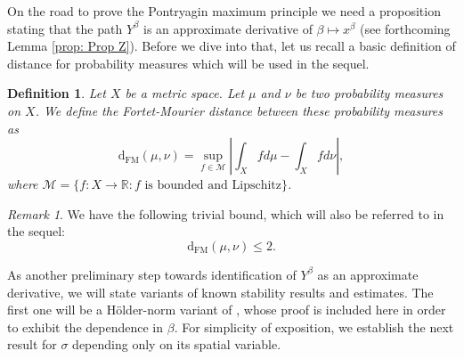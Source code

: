 \documentclass[12pt,reqno]{amsart}
\numberwithin{equation}{section}  %
\newcommand{\1}{{\bf 1}}
\newcommand{\2}{{\bf 2}}
\newcommand{\R}{\mathbb R}
\newtheorem{definition}[theorem]{Definition}
\theoremstyle{remark}
\newtheorem{remark}[theorem]{Remark}
\theoremstyle{remark}
\begin{document}
On the road to prove the Pontryagin maximum principle we need a proposition stating that the path $Y^{\beta}$ is an approximate derivative of $\beta \mapsto x^{\beta}$ (see forthcoming Lemma \ref{prop: Prop Z}). Before we dive into that, 
let us recall a basic definition of distance for probability measures which will be used in the sequel.
\begin{definition}\label{def: FM}
    Let $X$ be a metric space. Let $\mu$ and $\nu$ be two probability measures on $X$. 
    We define the \textit{Fortet-Mourier distance} between these probability measures as
    \begin{equation}\label{eq: FM}
        \mathrm{d_{FM}}(\mu,\nu)=\sup_{f\in \mathcal{M}}\left|\int_{X} f d\mu -\int_{X}fd\nu \right|,
    \end{equation}
    where $\mathcal{M}=\{f:X\to \R: f \text{ is bounded and Lipschitz}\}$.
\end{definition}
\begin{remark}
    \label{rmk: FM} We have the following trivial bound, which will also be referred to in the sequel:
    \begin{equation}\label{est: FM}
        \mathrm{d_{FM}}(\mu,\nu)\leq 2.
    \end{equation}
\end{remark}

As another preliminary step towards identification of $Y^{\beta}$ as an approximate derivative,
we will state variants of known stability results and estimates. The first one will be a H\"older-norm variant of \cite[Proposition 2.6]{allan-cohen}, whose proof is included here in order to exhibit the dependence in $\beta$. For simplicity of exposition, we establish the next result for $\sigma$ depending only on its spatial variable.
\end{document}
